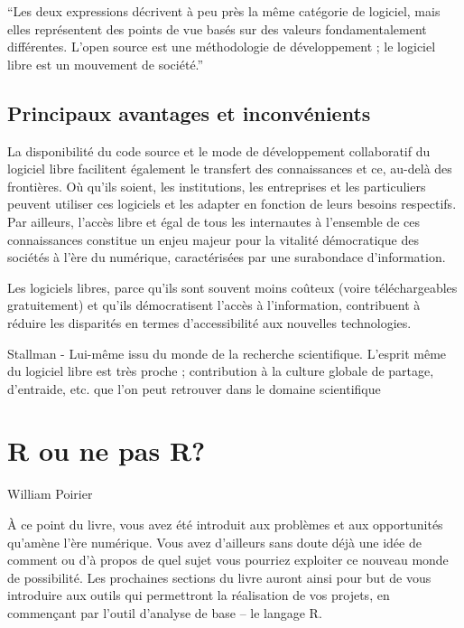 \documentclass[
  letterpaper,
  DIV=11,
  numbers=noendperiod]{scrreprt}
\begin{document}
``Les deux expressions décrivent à peu près la même catégorie de
logiciel, mais elles représentent des points de vue basés sur des
valeurs fondamentalement différentes. L'open source est une méthodologie
de développement ; le logiciel libre est un mouvement de société.''

\hypertarget{principaux-avantages-et-inconvuxe9nients}{%
\section{Principaux avantages et
inconvénients}\label{principaux-avantages-et-inconvuxe9nients}}

La disponibilité du code source et le mode de développement collaboratif
du logiciel libre facilitent également le transfert des connaissances et
ce, au-delà des frontières. Où qu'ils soient, les institutions, les
entreprises et les particuliers peuvent utiliser ces logiciels et les
adapter en fonction de leurs besoins respectifs. Par ailleurs, l'accès
libre et égal de tous les internautes à l'ensemble de ces connaissances
constitue un enjeu majeur pour la vitalité démocratique des sociétés à
l'ère du numérique, caractérisées par une surabondace d'information.

Les logiciels libres, parce qu'ils sont souvent moins coûteux (voire
téléchargeables gratuitement) et qu'ils démocratisent l'accès à
l'information, contribuent à réduire les disparités en termes
d'accessibilité aux nouvelles technologies.

Stallman - Lui-même issu du monde de la recherche scientifique. L'esprit
même du logiciel libre est très proche ; contribution à la culture
globale de partage, d'entraide, etc. que l'on peut retrouver dans le
domaine scientifique


\hypertarget{r-ou-ne-pas-r}{%
\chapter{R ou ne pas R?}\label{r-ou-ne-pas-r}}

\begin{flushright}
William Poirier
\end{flushright}

À ce point du livre, vous avez été introduit aux problèmes et aux
opportunités qu'amène l'ère numérique. Vous avez d'ailleurs sans doute
déjà une idée de comment ou d'à propos de quel sujet vous pourriez
exploiter ce nouveau monde de possibilité. Les prochaines sections du
livre auront ainsi pour but de vous introduire aux outils qui
permettront la réalisation de vos projets, en commençant par l'outil
d'analyse de base -- le langage R.
\end{document}
